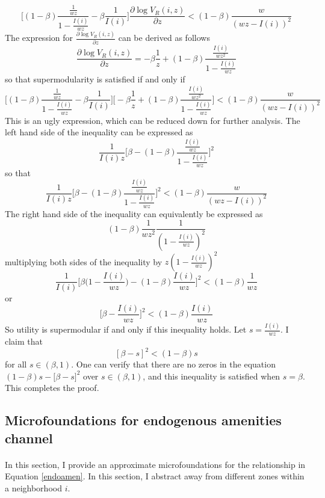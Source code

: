 \documentclass[12pt]{article}
\begin{document}
	$$\bigg[(1-\beta)\frac{\frac{1}{wz}}{1 - \frac{I(i)}{wz}} - \beta\frac{1}{I(i)}\bigg]\frac{\partial \log V_{R}(i, z)}{\partial z} < (1-\beta)\frac{w}{(wz - I(i))^{2}}$$
	The expression for $\frac{\partial \log V_{R}(i, z)}{\partial z }$ can be derived as follows 
	$$\frac{\partial \log V_{R}(i, z)}{\partial z } = -\beta \frac{1}{z} + (1-\beta)\frac{\frac{I(i)}{wz^{2}}}{1 - \frac{I(i)}{wz}}$$
	so that supermodularity is satisfied if and only if 
	$$\bigg[(1-\beta)\frac{\frac{1}{wz}}{1 - \frac{I(i)}{wz}} - \beta\frac{1}{I(i)}\bigg]\bigg[-\beta \frac{1}{z} + (1-\beta)\frac{\frac{I(i)}{wz^{2}}}{1 - \frac{I(i)}{wz}}\bigg] < (1-\beta)\frac{w}{(wz - I(i))^{2}}$$
	This is an ugly expression, which can be reduced down for further analysis. The left hand side of the inequality can be expressed as 
	$$\frac{1}{I(i)z}\bigg[\beta - (1-\beta)\frac{\frac{I(i)}{wz}}{1 - \frac{I(i)}{wz}}\bigg]^{2}$$ so that 
	$$\frac{1}{I(i)z}\bigg[\beta - (1-\beta)\frac{\frac{I(i)}{wz}}{1 - \frac{I(i)}{wz}}\bigg]^{2} < (1-\beta)\frac{w}{(wz - I(i))^{2}}$$
	The right hand side of the inequality can equivalently be expressed as $$(1-\beta)\frac{1}{wz^{2}}\frac{1}{(1 - \frac{I(i)}{wz})^{2}}$$
	multiplying both sides of the inequality by $z(1- \frac{I(i)}{wz})^{2}$ 
	$$\frac{1}{I(i)}\bigg[\beta\big(1 - \frac{I(i)}{wz}\big) - (1-\beta)\frac{I(i)}{wz}\bigg]^{2} < (1 - \beta)\frac{1}{wz}$$ or 
	$$\bigg[\beta - \frac{I(i)}{wz}\bigg]^{2} < (1-\beta)\frac{I(i)}{wz}$$
	So utility is supermodular if and only if this inequality holds. Let $s = \frac{I(i)}{wz}$. I claim that 
	$$[\beta - s]^{2} < (1-\beta)s$$ for all $s \in (\beta, 1)$. One can verify that there are no zeros in the equation $(1-\beta)s - \big[\beta - s]^{2}$ over $s \in (\beta, 1)$, and this inequality is satisfied when $s = \beta$. This completes the proof.
	
	\clearpage
	
	\subsection{Microfoundations for endogenous amenities channel}\label{microfoundations}
	
	\paragraph*{}
	In this section, I provide an approximate microfoundations for the relationship in Equation \eqref{endoamen}. In this section, I abstract away from different zones within a neighborhood $i$.
\end{document}

